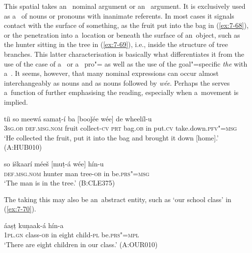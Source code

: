  This spatial  takes an~ nominal argument or an~  argument. It is exclusively used as a~ of nouns or pronouns with inanimate referents. In most cases it signals contact with the surface of something, as the fruit put into the bag in (\ref{ex:7-68}), or the penetration into a~location or beneath the surface of an~object, such as the hunter sitting in the tree in (\ref{ex:7-69}), i.e., inside the structure of tree branches. This latter characterisation is basically what differentiates it from the  use of the  case of a~ or a~ pro"= as well as the use of the goal"=specific  \textit{the} with a~. It seems, however, that many  nominal expressions can occur almost interchangeably as  nouns and as nouns followed by \textit{wée}. Perhaps the  serves a~function of further emphasising the  reading, especially when a~movement is implied.

\begin{exe}
\ex
\label{ex:7-68}
\gll tíi so meewá samaṭ-í ba [booǰée wée] de wheelíl-u \\
\textsc{3sg.ob} \textsc{def.msg.nom} fruit collect-\textsc{cv} \textsc{prt} bag.\textsc{ob} in  put.\textsc{cv} take.down.\textsc{pfv"=msg }\\
\glt `He collected the fruit, put it into the bag and brought it down [home].' (A:HUB010)
\end{exe}
\begin{exe}
\ex
\label{ex:7-69}
\gll so iškaarí méeš [muṭ-á wée] hín-u \\
\textsc{def.msg.nom} hunter man tree-\textsc{ob} in be.\textsc{prs"=msg} \\
\glt `The man is in the tree.' (B:CLE375)
\end{exe}

The  taking this  may also be an~abstract entity, such as `our school class' in (\ref{ex:7-70}).

\begin{exe}
\ex
\label{ex:7-70}
 áaṣṭ kuṇaak-á hín-a \\
\textsc{1pl.gn} class-\textsc{ob} in eight child-\textsc{pl}  be.\textsc{prs"=mpl} \\
\glt `There are eight children in our class.' (A:OUR010)
\end{exe}


